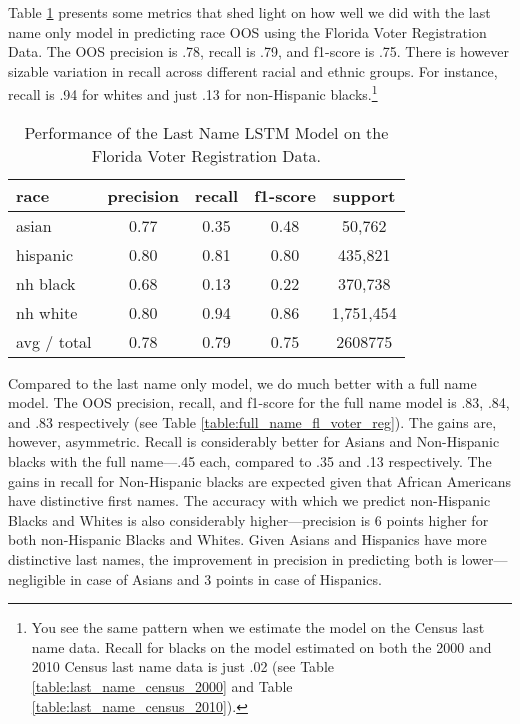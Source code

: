 \documentclass[12pt, letterpaper]{article}
\begin{document}
Table \ref{table:last_name_fl_voter_reg} presents some metrics that shed light on how well we did with the last name only model in predicting race OOS using the Florida Voter Registration Data. The OOS precision is .78, recall is .79, and f1-score is .75. There is however sizable variation in recall across different racial and ethnic groups. For instance, recall is .94 for whites and just .13 for non-Hispanic blacks.\footnote{You see the same pattern when we estimate the model on the Census last name data. Recall for blacks on the model estimated on both the 2000 and 2010 Census last name data is just .02 (see Table \ref{table:last_name_census_2000} and Table \ref{table:last_name_census_2010}).}

\begin{table}[h!]
\centering
\caption{Performance of the Last Name LSTM Model on the Florida Voter Registration Data.}
\begin{tabular}{ l c c c c }
\hline    
    race & precision & recall & f1-score & support \\
\hline
   asian & 0.77 & 0.35 & 0.48 & 50,762 \\
   hispanic &  0.80 & 0.81 & 0.80 & 435,821 \\
   nh black & 0.68 & 0.13 & 0.22 & 370,738 \\
   nh white & 0.80 & 0.94 & 0.86 & 1,751,454 \\
avg / total     &    0.78 & 0.79  &  0.75 & 2608775 \\
\hline
\end{tabular}
\label{table:last_name_fl_voter_reg}
\end{table}

Compared to the last name only model, we do much better with a full name model. The OOS precision, recall, and f1-score for the full name model is .83, .84, and .83 respectively (see Table \ref{table:full_name_fl_voter_reg}). The gains are, however, asymmetric. Recall is considerably better for Asians and Non-Hispanic blacks with the full name---.45 each, compared to .35 and .13 respectively. The gains in recall for Non-Hispanic blacks are expected given that African Americans have distinctive first names. The accuracy with which we predict non-Hispanic Blacks and Whites is also considerably higher---precision is 6 points higher for both non-Hispanic Blacks and Whites. Given Asians and Hispanics have more distinctive last names, the improvement in precision in predicting both is lower---negligible in case of Asians and 3 points in case of Hispanics.
\end{document}
